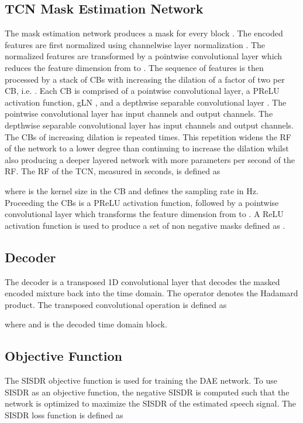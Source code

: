 \documentclass[conference,a4paper]{IEEEtran}
\begin{document}
\subsection{\texorpdfstring{\Ac{TCN} Mask Estimation Network}{TCN Mask Estimation}}
The mask estimation network produces a {mask}  for {every block .} The encoded features {} are first normalized using channelwise layer normalization \cite{ba2016layer}. The normalized features are transformed by a pointwise convolutional layer \cite{convtasnet} which reduces the feature dimension from  to . 
The sequence of features is then processed by a stack of  \acp{CB} with increasing the dilation  of a factor of two per \ac{CB}, i.e. . Each \ac{CB} is comprised of a pointwise convolutional 
{layer}, a \ac{PReLU} activation function, \ac{gLN} \cite{convtasnet}, and a depthwise separable convolutional layer \cite{convtasnet}.
The pointwise convolutional layer has  input channels and  output channels. The depthwise separable convolutional layer has  input channels and  output channels. 
The  \acp{CB} of increasing dilation is repeated  times. This {repetition} widens the \ac{RF} of the network to a {lower} degree than continuing to increase the dilation whilst also producing a deeper layered network with more parameters per second of the \ac{RF}. The \ac{RF} of the \ac{TCN}, measured in seconds, is defined as

where  is the kernel size in the \ac{CB} and  defines the sampling rate in Hz.
Proceeding the \acp{CB} is a \ac{PReLU} activation function, followed by a pointwise convolutional layer which transforms the feature dimension from  to . A ReLU activation function is used to produce a set of non negative masks
defined as .
\subsection{Decoder}
The decoder is a transposed 1D convolutional layer that decodes the masked encoded mixture  back into the time domain. {The operator  denotes the Hadamard product.} The transposed convolutional operation is defined as

where  and  is the decoded time domain block.
\subsection{Objective Function}
The \ac{SISDR} objective function
\cite{LeRoux} is used for training the \ac{DAE} network. To use \ac{SISDR} as an objective function, the negative \ac{SISDR} is computed such that the network is optimized to maximize the \ac{SISDR} of the estimated speech signal. The \ac{SISDR} loss function is defined as
\end{document}
